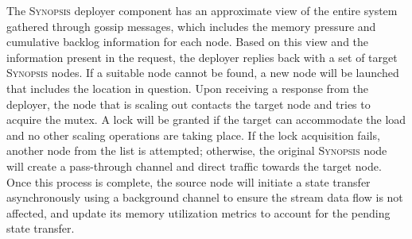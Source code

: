 The \textsc{Synopsis} deployer component has an approximate view of the entire system gathered through gossip messages, which includes the memory pressure and cumulative backlog information for each node.
Based on this view and the information present in the request, the deployer replies back with a set of target \textsc{Synopsis} nodes.
If a suitable node cannot be found, a new node will be launched that includes the location in question.
Upon receiving a response from the deployer, the node that is scaling out contacts the target node and tries to acquire the mutex.
A lock will be granted if the target can accommodate the load and no other scaling operations are taking place.
If the lock acquisition fails, another node from the list is attempted; otherwise, the original \textsc{Synopsis} node will create a pass-through channel and direct traffic towards the target node.
Once this process is complete, the source node will initiate a state transfer asynchronously using a background channel to ensure the stream data flow is not affected, and update its memory utilization metrics to account for the pending state transfer.
%
